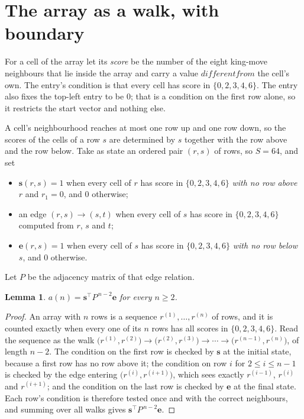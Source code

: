 \documentclass[11pt,a4paper]{article}
\theoremstyle{plain}
\newtheorem{lemma}[theorem]{Lemma}
\theoremstyle{definition}
\begin{document}
\section{The array as a walk, with boundary}

For a cell of the array let its \emph{score} be the number of the eight king-move neighbours that lie inside
the array and carry a value $different from$ the cell's own. The entry's condition is that every cell
has score in $\{0,2,3,4,6\}$. The entry also fixes the top-left entry to be $0$; that is a condition on the first row alone, so it restricts the start vector and nothing else.

A cell's neighbourhood reaches at most one row up and one row down, so the scores of the
cells of a row $s$ are determined by $s$ together with the row above and the row below.
Take as state an ordered pair $(r,s)$ of rows, so $S=64$, and set
\begin{itemize}
\item $\mathbf{s}(r,s)=1$ when every cell of $r$ has score in $\{0,2,3,4,6\}$ \emph{with no row
above $r$} and $r_1=0$, and $0$ otherwise;
\item an edge $(r,s)\to(s,t)$ when every cell of $s$ has score in $\{0,2,3,4,6\}$ computed from
$r$, $s$ and $t$;
\item $\mathbf{e}(r,s)=1$ when every cell of $s$ has score in $\{0,2,3,4,6\}$ \emph{with no row
below $s$}, and $0$ otherwise.
\end{itemize}
Let $P$ be the adjacency matrix of that edge relation.

\begin{lemma}\label{lem:walk}
$a(n)=\mathbf{s}^{\!\top}P^{\,n-2}\mathbf{e}$ for every $n\ge2$.
\end{lemma}

\begin{proof}
An array with $n$ rows is a sequence $r^{(1)},\dots,r^{(n)}$ of rows, and it is counted
exactly when every one of its $n$ rows has all scores in $\{0,2,3,4,6\}$. Read the sequence as the
walk $\bigl(r^{(1)},r^{(2)}\bigr)\to\bigl(r^{(2)},r^{(3)}\bigr)\to\cdots\to
\bigl(r^{(n-1)},r^{(n)}\bigr)$, of length $n-2$. The condition on the first row is
checked by $\mathbf{s}$ at the initial state, because a first row has no row above it; the
condition on row $i$ for $2\le i\le n-1$ is checked by the edge entering
$\bigl(r^{(i)},r^{(i+1)}\bigr)$, which sees exactly $r^{(i-1)}$, $r^{(i)}$ and
$r^{(i+1)}$; and the condition on the last row is checked by $\mathbf{e}$ at the final
state. Each row's condition is therefore tested once and with the correct neighbours, and
summing over all walks gives $\mathbf{s}^{\!\top}P^{\,n-2}\mathbf{e}$.
\end{proof}
\end{document}
